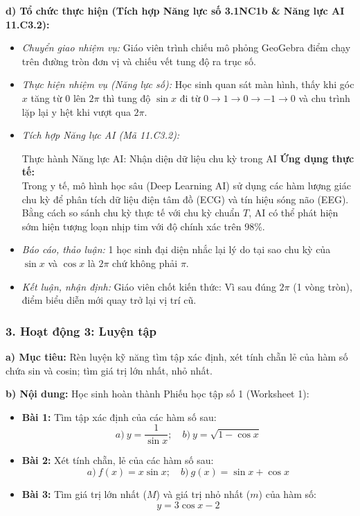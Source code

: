 \documentclass[12pt, a4paper]{article}
\begin{document}
\textbf{d) Tổ chức thực hiện (Tích hợp Năng lực số 3.1NC1b \& Năng lực AI 11.C3.2):}
\begin{itemize}[leftmargin=0.6cm]
    \item \textit{Chuyển giao nhiệm vụ:} Giáo viên trình chiếu mô phỏng GeoGebra điểm chạy trên đường tròn đơn vị và chiếu vết tung độ ra trục số.
    \item \textit{Thực hiện nhiệm vụ (Năng lực số):} Học sinh quan sát màn hình, thấy khi góc $x$ tăng từ $0$ lên $2\pi$ thì tung độ $\sin x$ đi từ $0 \to 1 \to 0 \to -1 \to 0$ và chu trình lặp lại y hệt khi vượt qua $2\pi$.
    \item \textit{Tích hợp Năng lực AI (Mã 11.C3.2):}
    \begin{aibox}{Thực hành Năng lực AI: Nhận diện dữ liệu chu kỳ trong AI}
        \textbf{Ứng dụng thực tế:}\\
        Trong y tế, mô hình học sâu (Deep Learning AI) sử dụng các hàm lượng giác chu kỳ để phân tích dữ liệu điện tâm đồ (ECG) và tín hiệu sóng não (EEG). Bằng cách so sánh chu kỳ thực tế với chu kỳ chuẩn $T$, AI có thể phát hiện sớm hiện tượng loạn nhịp tim với độ chính xác trên 98\%.
    \end{aibox}
    \item \textit{Báo cáo, thảo luận:} 1 học sinh đại diện nhắc lại lý do tại sao chu kỳ của $\sin x$ và $\cos x$ là $2\pi$ chứ không phải $\pi$.
    \item \textit{Kết luận, nhận định:} Giáo viên chốt kiến thức: Vì sau đúng $2\pi$ (1 vòng tròn), điểm biểu diễn mới quay trở lại vị trí cũ.
\end{itemize}

\subsubsection*{3. Hoạt động 3: Luyện tập}
\textbf{a) Mục tiêu:} Rèn luyện kỹ năng tìm tập xác định, xét tính chẵn lẻ của hàm số chứa sin và cosin; tìm giá trị lớn nhất, nhỏ nhất.

\textbf{b) Nội dung:} Học sinh hoàn thành Phiếu học tập số 1 (Worksheet 1):
\begin{itemize}[leftmargin=0.6cm]
    \item \textbf{Bài 1:} Tìm tập xác định của các hàm số sau:
    $$a) \ y = \dfrac{1}{\sin x}; \quad b) \ y = \sqrt{1 - \cos x}$$
    \item \textbf{Bài 2:} Xét tính chẵn, lẻ của các hàm số sau:
    $$a) \ f(x) = x \sin x; \quad b) \ g(x) = \sin x + \cos x$$
    \item \textbf{Bài 3:} Tìm giá trị lớn nhất ($M$) và giá trị nhỏ nhất ($m$) của hàm số:
    $$y = 3\cos x - 2$$
\end{itemize}
\end{document}
